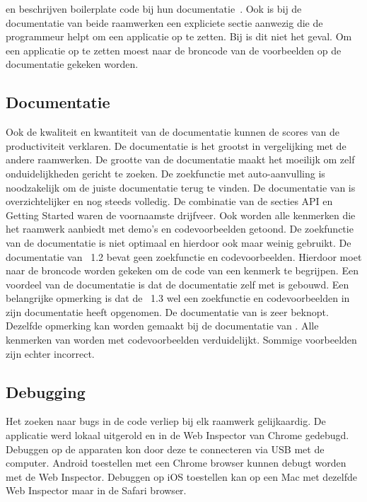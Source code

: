 \jqm{} en \kendo{} beschrijven boilerplate code bij hun documentatie~\cite{JQuery2012b,Telerikd}.
Ook is bij de documentatie van beide raamwerken een expliciete sectie aanwezig die de programmeur helpt om een applicatie op te zetten.
Bij \lungo{} is dit niet het geval.  
Om een \lungo{} applicatie op te zetten moest naar de broncode van de voorbeelden op de documentatie gekeken worden.

\subsection{Documentatie}
Ook de kwaliteit en kwantiteit van de documentatie kunnen de scores van de productiviteit verklaren.
De \st{} documentatie is het grootst in vergelijking met de andere raamwerken.
De grootte van de documentatie maakt het moeilijk om zelf onduidelijkheden gericht te zoeken.
De zoekfunctie met auto-aanvulling is noodzakelijk om de juiste documentatie terug te vinden.
De documentatie van \kendo{} is overzichtelijker en nog steeds volledig.
De combinatie van de secties API en Getting Started waren de voornaamste drijfveer.
Ook worden alle kenmerken die het raamwerk aanbiedt met demo's en codevoorbeelden getoond.
De zoekfunctie van de documentatie is niet optimaal en hierdoor ook maar weinig gebruikt.
De documentatie van \jqm{}~1.2 bevat geen zoekfunctie en codevoorbeelden.
Hierdoor moet naar de broncode worden gekeken om de code van een kenmerk te begrijpen.
Een voordeel van de \jqm{} documentatie is dat de documentatie zelf met \jqm{} is gebouwd.
Een belangrijke opmerking is dat de \jqm{}~1.3 wel een zoekfunctie en codevoorbeelden in zijn documentatie heeft opgenomen.
De documentatie van \lungo{} is zeer beknopt.
Dezelfde opmerking kan worden gemaakt bij de documentatie van \quo.
Alle kenmerken van \lungo{} worden met codevoorbeelden verduidelijkt.
Sommige voorbeelden zijn echter incorrect.

\subsection{Debugging}
Het zoeken naar bugs in de code verliep bij elk raamwerk gelijkaardig.
De applicatie werd lokaal uitgerold en in de Web Inspector van Chrome gedebugd.
Debuggen op de apparaten kon door deze te connecteren via USB met de computer.
Android toestellen met een Chrome browser kunnen debugt worden met de Web Inspector.
Debuggen op iOS toestellen kan op een Mac met dezelfde Web Inspector maar in de Safari browser.

